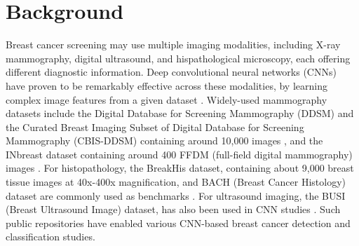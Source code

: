 \documentclass[../main]{subfiles}
\begin{document}
\chapter{Background}
\label{chap:background}
Breast cancer screening may use multiple imaging modalities, including X-ray mammography, digital ultrasound, and hispathological microscopy, each offering different diagnostic information. Deep convolutional neural networks (CNNs) have proven to be remarkably effective across these modalities, by learning complex image features from a given dataset \autocite{jiang2024deep} \autocite{carriero2024deep}. Widely-used mammography datasets include the Digital Database for Screening Mammography (DDSM) \autocite{carriero2024deep} and the Curated Breast Imaging Subset of Digital Database for Screening Mammography (CBIS-DDSM) containing around 10,000 images \autocite{carriero2024deep}, and the INbreast dataset containing around 400 FFDM (full-field digital mammography) images \autocite{carriero2024deep}. For histopathology, the BreakHis dataset, containing about 9,000 breast tissue images at 40x-400x magnification, and BACH (Breast Cancer Histology) dataset are commonly used as benchmarks \autocite{jiang2024deep} \autocite{srikantamurthy2023classification}. For ultrasound imaging, the BUSI (Breast Ultrasound Image) dataset, has also been used in CNN studies \autocite{latha2024revolutionizing}. Such public repositories have enabled various CNN-based breast cancer detection and classification studies.
\end{document}
